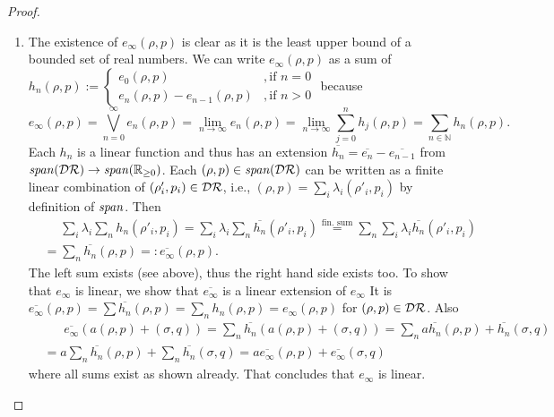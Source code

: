 \documentclass[a4paper,UKenglish,cleveref, autoref, thm-restate]{lipics-v2021}
\begin{document}
\begin{proof}
\begin{enumerate}
        \item The existence of $e_\infty (\rho,p)$ is clear as it is the least upper bound of a bounded set of real numbers. We can write $e_\infty (\rho,p)$ as a sum of $h_n(\rho,p) := \begin{cases} e_0(\rho,p) &, \text{if }n=0\\
            e_n(\rho,p)-e_{n-1}(\rho,p) &,\text{if } n>0 \end{cases}$ because
        \begin{equation*}
            e_\infty(\rho,p) = \bigvee_{n=0}^\infty e_n(\rho,p) = \lim_{n \to \infty} e_n(\rho,p) = \lim_{n\to \infty} \sum_{j=0}^n h_j(\rho,p) = \sum_{n \in \mathbb{N}}h_n(\rho,p).
        \end{equation*}
        Each $h_n$ is a linear function and thus has an extension $\overline{h_n}= \overline{e_n} - \overline{e_{n-1}}$ from $\mathit{span}(\mathcal{D}\mathcal{R}) \to \mathit{span}(\mathbb{R}_{\geq 0})$. Each $(\rho,p) \in \mathit{span}(\mathcal{D}\mathcal{R})$ can be written as a finite linear combination of $(\rho'_i,p_i) \in \mathcal{D}\mathcal{R}$, i.e., $(\rho,p) = \sum_i \lambda_i (\rho'_i,p_i)$ by definition of $\mathit{span}$. Then
        \begin{align*}
            &\phantom{=} \sum_i \lambda_i \sum_n h_n(\rho'_i,p_i)=  \sum_i \lambda_i \sum_n \overline{h_n}(\rho'_i,p_i) \overset{\text{fin. sum}}{=} \sum_n \sum_i \lambda_i \overline{h_n}(\rho'_i,p_i)\\
            &= \sum_n \overline{h_n}(\rho,p) =: \overline{e_\infty}(\rho,p).
        \end{align*}
        The left sum exists (see above), thus the right hand side exists too. To show that $e_\infty$ is linear, we show that $\overline{e_\infty}$ is a linear extension of $e_\infty$
        It is $\overline{e_\infty}(\rho,p)=\sum \overline{h_n}(\rho,p) = \sum_n h_n(\rho,p) = e_\infty(\rho,p)$ for $(\rho,p) \in \mathcal{D}\mathcal{R}$. Also \begin{align*}
            &\phantom{=.}\overline{e_\infty}(a (\rho,p) + (\sigma,q))
            = \sum_n \overline{h_n}(a (\rho,p) + (\sigma,q))
            = \sum_n a \overline{h_n}(\rho,p) + \overline{h_n}(\sigma,q)\\
            &= a \sum_n \overline{h_n}(\rho,p) + \sum_n \overline{h_n}(\sigma,q)
            = a \overline{e_\infty}(\rho,p) + \overline{e_\infty}(\sigma,q)
        \end{align*}
        where all sums exist as shown already. That concludes that $e_\infty$ is linear.
    \end{enumerate}
\end{proof}
\end{document}
